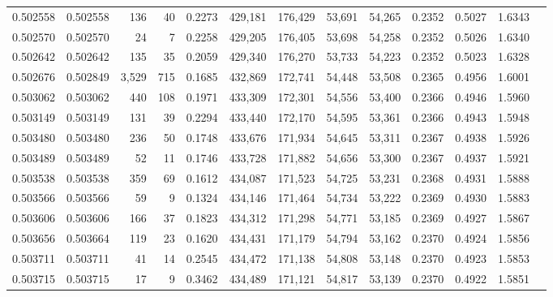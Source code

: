 \begin{tabular}{rrrrrrrrrrrrr}
0.502558 & 0.502558 &   136 &    40 &                                     0.2273 & 429,181 & 176,429 &  53,691 &  54,265 & 0.2352 & 0.5027 & 1.6343 \\
0.502570 & 0.502570 &    24 &     7 &                                     0.2258 & 429,205 & 176,405 &  53,698 &  54,258 & 0.2352 & 0.5026 & 1.6340 \\
0.502642 & 0.502642 &   135 &    35 &                                     0.2059 & 429,340 & 176,270 &  53,733 &  54,223 & 0.2352 & 0.5023 & 1.6328 \\
0.502676 & 0.502849 & 3,529 &   715 &                                     0.1685 & 432,869 & 172,741 &  54,448 &  53,508 & 0.2365 & 0.4956 & 1.6001 \\
0.503062 & 0.503062 &   440 &   108 &                                     0.1971 & 433,309 & 172,301 &  54,556 &  53,400 & 0.2366 & 0.4946 & 1.5960 \\
0.503149 & 0.503149 &   131 &    39 &                                     0.2294 & 433,440 & 172,170 &  54,595 &  53,361 & 0.2366 & 0.4943 & 1.5948 \\
0.503480 & 0.503480 &   236 &    50 &                                     0.1748 & 433,676 & 171,934 &  54,645 &  53,311 & 0.2367 & 0.4938 & 1.5926 \\
0.503489 & 0.503489 &    52 &    11 &                                     0.1746 & 433,728 & 171,882 &  54,656 &  53,300 & 0.2367 & 0.4937 & 1.5921 \\
0.503538 & 0.503538 &   359 &    69 &                                     0.1612 & 434,087 & 171,523 &  54,725 &  53,231 & 0.2368 & 0.4931 & 1.5888 \\
0.503566 & 0.503566 &    59 &     9 &                                     0.1324 & 434,146 & 171,464 &  54,734 &  53,222 & 0.2369 & 0.4930 & 1.5883 \\
0.503606 & 0.503606 &   166 &    37 &                                     0.1823 & 434,312 & 171,298 &  54,771 &  53,185 & 0.2369 & 0.4927 & 1.5867 \\
0.503656 & 0.503664 &   119 &    23 &                                     0.1620 & 434,431 & 171,179 &  54,794 &  53,162 & 0.2370 & 0.4924 & 1.5856 \\
0.503711 & 0.503711 &    41 &    14 &                                     0.2545 & 434,472 & 171,138 &  54,808 &  53,148 & 0.2370 & 0.4923 & 1.5853 \\
0.503715 & 0.503715 &    17 &     9 &                                     0.3462 & 434,489 & 171,121 &  54,817 &  53,139 & 0.2370 & 0.4922 & 1.5851 \\

\end{tabular}
